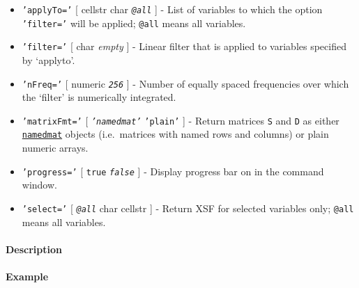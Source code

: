 \begin{itemize}
\item
  \texttt{'applyTo='} {[} cellstr \textbar{} char \textbar{}
  \emph{\texttt{@all}} {]} - List of variables to which the option
  \texttt{'filter='} will be applied; \texttt{@all} means all variables.
\item
  \texttt{'filter='} {[} char \textbar{} \emph{empty} {]} - Linear
  filter that is applied to variables specified by `applyto'.
\item
  \texttt{'nFreq='} {[} numeric \textbar{} \emph{\texttt{256}} {]} -
  Number of equally spaced frequencies over which the `filter' is
  numerically integrated.
\item
  \texttt{'matrixFmt='} {[} \emph{\texttt{'namedmat'}} \textbar{}
  \texttt{'plain'} {]} - Return matrices \texttt{S} and \texttt{D} as
  either \href{namedmat/Contents}{\texttt{namedmat}} objects
  (i.e.~matrices with named rows and columns) or plain numeric arrays.
\item
  \texttt{'progress='} {[} \texttt{true} \textbar{}
  \emph{\texttt{false}} {]} - Display progress bar on in the command
  window.
\item
  \texttt{'select='} {[} \emph{\texttt{@all}} \textbar{} char \textbar{}
  cellstr {]} - Return XSF for selected variables only; \texttt{@all}
  means all variables.
\end{itemize}

\paragraph{Description}

\paragraph{Example}


